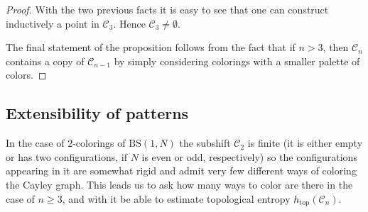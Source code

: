\documentclass{aims}
\newcommand{\BS}[1][N]{\mathrm{BS}(1,#1)}
\def\htop{h_{\mathrm{top}}}
\theoremstyle{definition}
\begin{document}
\begin{proof}
	
	With the two previous facts it is easy to see that one can construct inductively a point in $\mathcal{C}_3$. Hence $\mathcal{C}_3\neq \emptyset$.
	
	
	The final statement of the proposition follows from the fact that if $n> 3$, then $\mathcal{C}_n$ contains a copy of $\mathcal{C}_{n-1}$ by simply considering colorings with a smaller palette of colors.
\end{proof}


\subsection{Extensibility of patterns}\label{subsection:extensibility_patterns}
In the case of $2$-colorings of $\BS$ the subshift $\mathcal{C}_2$ is finite (it is either empty or has two configurations, if $N$ is even or odd, respectively) so the configurations appearing in it are somewhat rigid and admit very few different ways of coloring the Cayley graph. This leads us to ask how many ways to color are there in the case of $n\ge 3$, and with it be able to estimate topological entropy $\htop(\mathcal{C}_n)$.
\end{document}
